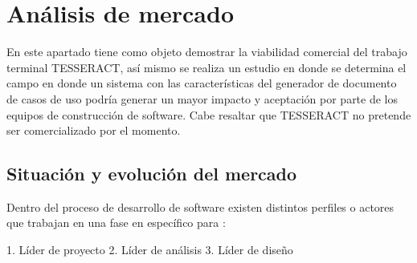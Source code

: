 \chapter{Análisis de mercado}

En este apartado tiene como objeto demostrar la viabilidad comercial del trabajo terminal TESSERACT, así mismo se realiza un estudio en donde se determina el campo en donde un sistema con las características del generador de documento de casos de uso podría generar un mayor impacto y aceptación por parte de los equipos de construcción de software. Cabe resaltar que TESSERACT no pretende ser comercializado por el momento.


\section{Situación  y evolución del mercado}

Dentro del proceso de desarrollo de software existen distintos perfiles o actores que trabajan en una fase en específico para :

1. Líder de proyecto
2. Líder de análisis
3. Líder de diseño
